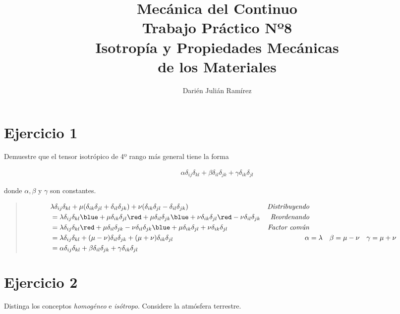 \documentclass[a4paper,10pt,twoside,final,spanish]{article}
\title{\Huge Mecánica del Continuo \\
			 Trabajo Práctico Nº8  \\
			 Isotropía y Propiedades Mecánicas \\ de los Materiales}
\author{Darién Julián Ramírez}
\date{}
\begin{document}
\maketitle %

\section*{Ejercicio 1}

Demuestre que el tensor isotrópico de 4º rango más general tiene la forma

\begin{align*}
\alpha\delta_{ij}\delta_{kl}+\beta\delta_{il}\delta_{jk}+\gamma\delta_{ik}\delta_{jl}
\end{align*}

donde $\alpha,\beta$ y $\gamma$ son constantes.

\dotfill

\begin{quote}

\begin{align*}
& \lambda\delta_{ij}\delta_{kl}
+\mu(\delta_{ik}\delta_{jl}+\delta_{il}\delta_{jk})
+\nu(\delta_{ik}\delta_{jl}-\delta_{il}\delta_{jk}) & \textit{Distribuyendo} \\
&= \lambda\delta_{ij}\delta_{kl}
{\blue +\mu\delta_{ik}\delta_{jl}}{\red +\mu\delta_{il}\delta_{jk}}
{\blue +\nu\delta_{ik}\delta_{jl}}
{\red -\nu\delta_{il}\delta_{jk}} & \textit{Reordenando} \\
&= \lambda\delta_{ij}\delta_{kl}
{\red +\mu\delta_{il}\delta_{jk}-\nu\delta_{il}\delta_{jk}}
{\blue +\mu\delta_{ik}\delta_{jl}+\nu\delta_{ik}\delta_{jl}} & \textit{Factor común}\\
&= \lambda\delta_{ij}\delta_{kl}
+(\mu-\nu)\delta_{il}\delta_{jk}
+(\mu+\nu)\delta_{ik}\delta_{jl}
& \alpha &= \lambda
& \beta &= \mu-\nu
& \gamma &= \mu+\nu \\
&= \alpha\delta_{ij}\delta_{kl}
+\beta\delta_{il}\delta_{jk}
+\gamma\delta_{ik}\delta_{jl}
\end{align*}

\end{quote}

\section*{Ejercicio 2}

Distinga los conceptos \textit{homogéneo} e \textit{isótropo}. Considere la atmósfera terrestre.
\end{document}
